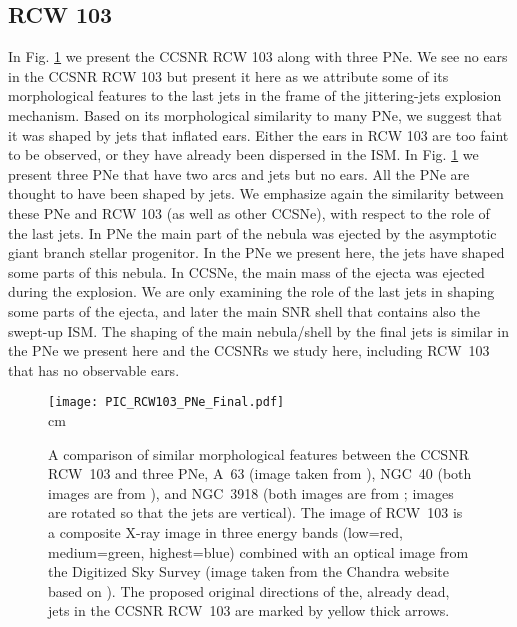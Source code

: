 \documentclass[12pt,preprint,a4paper]{aastex}
\begin{document}
\subsection{RCW 103}
\label{subsec:RCW103}
 
  In Fig. \ref{RCW103} we present the CCSNR RCW 103 along with three PNe. We see no ears in the CCSNR RCW 103 but present it here as we attribute some of its morphological features to the last jets in the frame of the jittering-jets explosion mechanism. Based on its morphological similarity to many PNe, we suggest that it was shaped by jets that inflated ears. Either the ears in RCW 103 are too faint to be observed, or they have already been dispersed in the ISM. 
In Fig. \ref{RCW103} we present three PNe that have two arcs and jets but no ears. All the PNe are thought to have been shaped by jets. We emphasize again the similarity between these PNe and RCW 103 (as well as other CCSNe), with respect to the role of the last jets. In PNe the main part of the nebula was ejected by the asymptotic giant branch stellar progenitor. In the PNe we present here, the jets have shaped some parts of this nebula. In CCSNe, the main mass of the ejecta was ejected during the explosion. We are only examining the role of the last jets in shaping some parts of the ejecta, and later the main SNR shell that contains also the swept-up ISM. The shaping of the main nebula/shell by the final jets is similar in the PNe we present here and the CCSNRs we study here, including RCW~103 that has no observable ears. 
\begin{figure}  %
\texttt{[image: PIC\_RCW103\_PNe\_Final.pdf]}\\
 cm
\centering
\caption{A comparison of similar morphological features between the CCSNR RCW~103 and three PNe, A~63 (image taken from \citealt{Mitchelletal2007}), NGC~40 (both images are from \citealt{Meaburnetal1996}), and NGC~3918 (both images are from \citealt{Corradietal1999}; images are rotated so that the jets are vertical).  
The image of RCW~103 is a composite X-ray image in three energy bands (low=red, medium=green, highest=blue) combined with an optical image from the Digitized Sky Survey (image taken from the Chandra website based on \citealt{Reaetal2016}). 
The proposed original directions of the, already dead, jets in the CCSNR RCW~103 are marked by yellow thick arrows.} 
\label{RCW103}
\end{figure}
\end{document}
